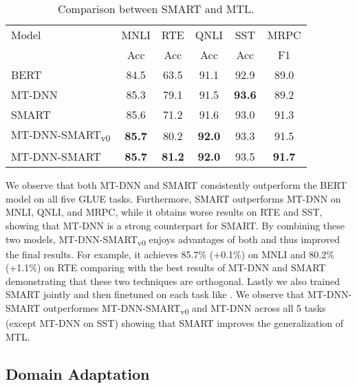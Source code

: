 \documentclass[11pt]{article} \usepackage{url}
\newcommand\model{SMART}
\begin{document}
\begin{table}[!htb]
\centering
    \begin{tabular}{@{\hskip1pt}l@{\hskip1pt}|@{\hskip1pt}c@{\hskip1pt}|@{\hskip1pt}c@{\hskip1pt}|@{\hskip1pt}c@{\hskip1pt}|@{\hskip1pt}c@{\hskip1pt} |@{\hskip1pt} c@{\hskip1pt}}
    \hline
   Model                        &MNLI   &RTE    & QNLI  &SST    &MRPC \\ 
                                &Acc    &Acc    &Acc    &Acc    &F1  \\\hline  \hline
     BERT                       &84.5   &63.5   &91.1   &92.9   &89.0 \\ \hline
     MT-DNN                     &85.3   &79.1   &91.5   &\textbf{93.6}   &89.2 \\ \hline 
     {\model}                   &85.6   &71.2   &91.6   &93.0   &91.3 \\ \hline
     MT-DNN-{\model}\textsubscript{v0}            &\textbf{85.7}   &80.2   &\textbf{92.0}   &93.3   &91.5 \\ \hline
     MT-DNN-{\model}            &\textbf{85.7}       &\textbf{81.2}   &\textbf{92.0}     &93.5       &\textbf{91.7}  \\ \hline
    \end{tabular}
\caption{Comparison between {\model} and MTL. }
    \label{tab:smart_mtl}
\end{table}

We observe that both MT-DNN and {\model} consistently outperform the BERT model on all five GLUE tasks. Furthermore, {\model} outperforms MT-DNN on MNLI, QNLI, and MRPC, while it obtains worse results on RTE and SST, showing that MT-DNN is a strong counterpart for {\model}. By combining these two models, MT-DNN-{\model}\textsubscript{v0} enjoys advantages of both and thus improved the final results. For example, it achieves 85.7\% (+0.1\%) on MNLI and 80.2\% (+1.1\%) on RTE comparing with the best results of MT-DNN and {\model} demonstrating that these two techniques are orthogonal. Lastly we also trained {\model} jointly and then finetuned on each task like \citet{liu2019mt-dnn}. We observe that MT-DNN-{\model} outperformes MT-DNN-{\model}\textsubscript{v0} and MT-DNN across all 5 tasks (except MT-DNN on SST) showing that {\model} improves the generalization of MTL.

\subsection{Domain Adaptation}
\label{subsec:domain}
\end{document}
